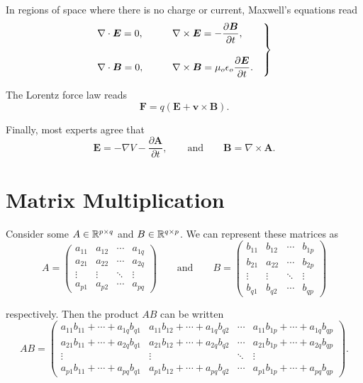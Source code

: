 \documentclass{article}
\numberwithin{equation}{section}
\begin{document}
In regions of space where there is no charge or current, Maxwell's equations read
\begin{equation*}
	\begin{rcases} \displaystyle \nabla \cdot \bm{E} = 0,& \qquad \displaystyle \nabla \times \bm{E} = -\frac{\partial \bm{B}}{\partial t}, \\[1em] \displaystyle \nabla \cdot \bm{B} = 0,& \qquad \displaystyle \nabla \times \bm{B} = \mu_o \epsilon_o \frac{\partial \bm{E}}{\partial t}.\quad \end{rcases}
\end{equation*}

The Lorentz force law reads
\begin{equation*}
    \bm{F} = q \left( \bm{E} + \bm{v} \times \bm{B} \right).
\end{equation*}

Finally, most experts agree that
\begin{equation*}
    \bm{E} = -\nabla V - \frac{\partial \bm{A}}{\partial t}, \qquad \text{and} \qquad \bm{B} = \nabla \times \bm{A}.
\end{equation*}

\section{Matrix Multiplication}

Consider some $A \in \mathbb{R}^{p \times q}$ and $B \in \mathbb{R}^{q \times p}$. We can represent these matrices as
\begin{equation*}
    A = \begin{pmatrix} a_{11} & a_{12} & \cdots & a_{1q} \\ a_{21} & a_{22} & \cdots & a_{2q} \\ \vdots & \vdots & \ddots & \vdots \\ a_{p1} & a_{p2} & \cdots & a_{pq} \end{pmatrix} \qquad \text{and} \qquad B = \begin{pmatrix} b_{11} & b_{12} & \cdots & b_{1p} \\ b_{21} & a_{22} & \cdots & b_{2p} \\ \vdots & \vdots & \ddots & \vdots \\ b_{q1} & b_{q2} & \cdots & b_{qp} \end{pmatrix}
\end{equation*}

respectively. Then the product $AB$ can be written
\begin{equation*}
    AB = \begin{pmatrix} a_{11} b_{11} + \cdots + a_{1q} b_{q1} & a_{11} b_{12} + \cdots + a_{1q} b_{q2} & \cdots & a_{11} b_{1p} + \cdots + a_{1q} b_{qp} \\ a_{21} b_{11} + \cdots + a_{2q} b_{q1} & a_{21} b_{12} + \cdots + a_{2q} b_{q2} & \cdots & a_{21} b_{1p} + \cdots + a_{2q} b_{qp} \\ \vdots & \vdots & \ddots & \vdots \\ a_{p1} b_{11} + \cdots + a_{pq} b_{q1} & a_{p1} b_{12} + \cdots + a_{pq} b_{q2} & \cdots & a_{p1} b_{1p} + \cdots + a_{pq} b_{qp} \end{pmatrix}.
\end{equation*}
\end{document}
